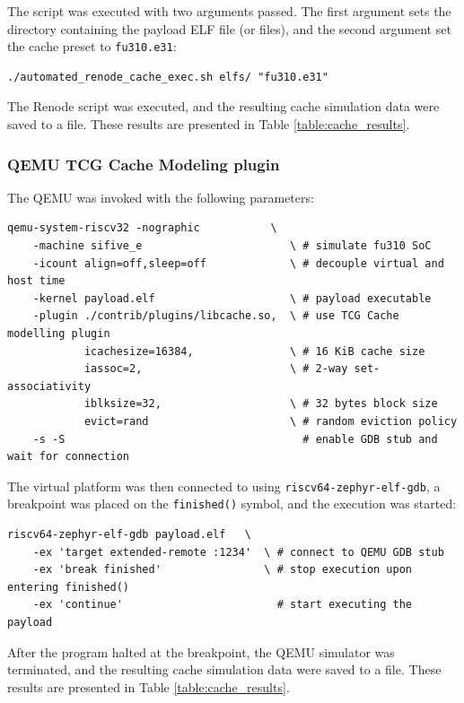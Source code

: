 \noindent The script was executed with two arguments passed. The first argument sets the directory containing the payload ELF file (or files), and the second argument set the cache preset to \texttt{fu310.e31}:
\begin{verbatim}
./automated_renode_cache_exec.sh elfs/ "fu310.e31"
\end{verbatim}

\noindent The Renode script was executed, and the resulting cache simulation data were saved to a file. These results are presented in Table \ref{table:cache_results}.


\subsubsection{QEMU TCG Cache Modeling plugin}
The QEMU was invoked with the following parameters:
\begin{verbatim}
qemu-system-riscv32 -nographic           \
	-machine sifive_e                       \ # simulate fu310 SoC
	-icount align=off,sleep=off             \ # decouple virtual and host time
	-kernel payload.elf                     \ # payload executable
	-plugin ./contrib/plugins/libcache.so,  \ # use TCG Cache modelling plugin
	        icachesize=16384,               \ # 16 KiB cache size
	        iassoc=2,                       \ # 2-way set-associativity
	        iblksize=32,                    \ # 32 bytes block size
	        evict=rand                      \ # random eviction policy
	-s -S                                     # enable GDB stub and wait for connection
\end{verbatim}

\noindent The virtual platform was then connected to using \texttt{riscv64-zephyr-elf-gdb}, a breakpoint was placed on the \texttt{finished()} symbol, and the execution was started:
\begin{verbatim}
riscv64-zephyr-elf-gdb payload.elf   \
	-ex 'target extended-remote :1234'  \ # connect to QEMU GDB stub
	-ex 'break finished'                \ # stop execution upon entering finished()
	-ex 'continue'                        # start executing the payload
\end{verbatim}

\noindent After the program halted at the breakpoint, the QEMU simulator was terminated, and the resulting cache simulation data were saved to a file. These results are presented in %
Table \ref{table:cache_results}.


